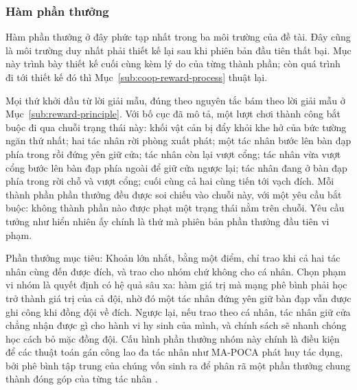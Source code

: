 \subsubsection{Hàm phần thưởng}
\indent Hàm phần thưởng ở đây phức tạp nhất trong ba môi trường của đề tài. Đây cũng là
môi trường duy nhất phải thiết kế lại sau khi phiên bản đầu tiên thất bại. Mục này trình
bày thiết kế cuối cùng kèm lý do của từng thành phần; còn quá trình đi tới thiết kế đó
thì Mục~\ref{sub:coop-reward-process} thuật lại.

\indent Mọi thứ khởi đầu từ lời giải mẫu, đúng theo nguyên tắc bám theo lời giải mẫu ở
Mục~\ref{sub:reward-principle}. Với bố cục đã mô tả, một lượt chơi thành công bắt buộc đi
qua chuỗi trạng thái này: khối vật cản bị đẩy khỏi khe hở của bức tường ngăn thứ nhất; hai
tác nhân rời phòng xuất phát; một tác nhân bước lên bàn đạp phía trong rồi đứng yên giữ
cửa; tác nhân còn lại vượt cổng; tác nhân vừa vượt cổng bước lên bàn đạp phía ngoài để giữ
cửa ngược lại; tác nhân đang ở bàn đạp phía trong rời chỗ và vượt cổng; cuối cùng cả hai
cùng tiến tới vạch đích. Mỗi thành phần phần thưởng đều được
soi chiếu vào chuỗi này, với một yêu cầu bắt buộc: không thành phần nào được phạt một
trạng thái nằm trên chuỗi. Yêu cầu tưởng như hiển nhiên ấy chính là thứ mà phiên bản phần
thưởng đầu tiên vi phạm.

\indent Phần thưởng mục tiêu: Khoản lớn nhất, bằng một điểm, chỉ trao khi cả hai
tác nhân cùng đến được đích, và trao cho nhóm chứ không cho cá nhân. Chọn phạm vi nhóm
là quyết định có hệ quả sâu xa: hàm giá trị mà mạng phê bình phải học trở thành giá trị
của cả đội, nhờ đó một tác nhân đứng yên giữ bàn đạp vẫn được ghi công khi đồng đội về
đích. Ngược lại, nếu trao theo cá nhân, tác nhân giữ cửa chẳng nhận được gì cho hành vi hy
sinh của mình, và chính sách sẽ nhanh chóng học cách bỏ mặc đồng đội. Cấu hình phần thưởng
nhóm này chính là điều kiện để các thuật toán gán công lao đa tác nhân như MA-POCA
\cite{cohen2022mapoca} phát huy tác dụng, bởi phê bình tập trung của chúng vốn sinh ra để
phân rã một phần thưởng chung thành đóng góp của từng tác nhân
\cite{foerster2018counterfactual}.

